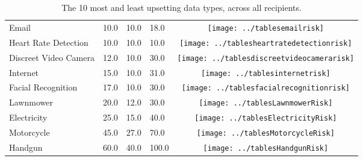 \begin{table}[t]
\begin{center}
\begin{tabular}{| p{2cm} | p{1cm} | p{1cm} | p{1cm} | c |}
Email & 10.0 & 10.0 & 18.0 & \texttt{[image: ../tablesemailrisk]} \\ 
Heart Rate Detection & 10.0 & 10.0 & 10.0 & \texttt{[image: ../tablesheartratedetectionrisk]} \\ 
Discreet Video Camera & 12.0 & 10.0 & 30.0 & \texttt{[image: ../tablesdiscreetvideocamerarisk]} \\ 
Internet & 15.0 & 10.0 & 31.0 & \texttt{[image: ../tablesinternetrisk]} \\ 
Facial Recognition & 17.0 & 10.0 & 30.0 & \texttt{[image: ../tablesfacialrecognitionrisk]} \\ 
Lawnmower & 20.0 & 12.0 & 30.0 & \texttt{[image: ../tablesLawnmowerRisk]} \\ 
Electricity & 25.0 & 15.0 & 40.0 & \texttt{[image: ../tablesElectricityRisk]} \\ 
Motorcycle & 45.0 & 27.0 & 70.0 & \texttt{[image: ../tablesMotorcycleRisk]} \\ 
Handgun & 60.0 & 40.0 & 100.0 & \texttt{[image: ../tablesHandgunRisk]} \\ 
\hline
\end{tabular}
\caption{The 10 most and least upsetting data types, across all recipients.}
\label{top10}
\end{center}
\end{table}
